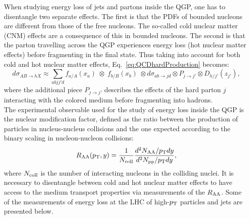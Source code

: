 When studying energy loss of jets and partons inside the QGP, one has to disentangle two separate effects. The first is that the PDFs of bounded nucleons are different from those of the free nucleons. The so-called cold nuclear matter (CNM) effects are a consequence of this in bounded nucleons. The second is that the parton travelling across the QGP experiences energy loss (hot nuclear matter effects) before fragmenting in the final state.
Thus taking into account for both cold and hot nuclear matter effects, Eq.~\ref{eq:QCDhardProduction} becomes:
\begin{equation}
\label{eq:QCDwNuclEffects}
d\sigma_{AB\rightarrow hX} \approx \sum_{abjj\prime d} f_{a/A} (x_a) \; \otimes \;f_{b/B} (x_b) \;\otimes d\sigma_{ab\rightarrow jd} \otimes P_{j\rightarrow j\prime} \otimes D_{h/j\prime}(z_{j\prime}), 
\end{equation}
where the additional piece $P_{j\rightarrow j\prime}$ describes the effects of the hard parton $j$ interacting with the colored medium before fragmenting into hadrons. \\

The experimental observable used for the study of energy loss inside the QGP is the nuclear modification factor, defined as the ratio between the production of particles in nucleus-nucleus collisions and the one expected according to the binary scaling in nucleon-nucleon collisions:
\begin{equation}
\label{eq:Raa}
R_{\rm AA} (p_{\rm T}, y) = \frac{1}{N_{\rm coll}}\frac{d^2N_{\rm AA}/p_{\rm T} dy}{d^2N_{\rm pp}/p_{\rm T} dy},
\end{equation}
where $N_{\rm coll}$ is the number of interacting nucleons in the colliding nuclei.
It is necessary to disentangle between cold and hot nuclear matter effects to have access to the medium transport properties via measurements of the $R_{\rm AA}$. Some of the measurements of energy loss at the LHC of high-$p_{\rm T}$ particles and jets are presented below.

